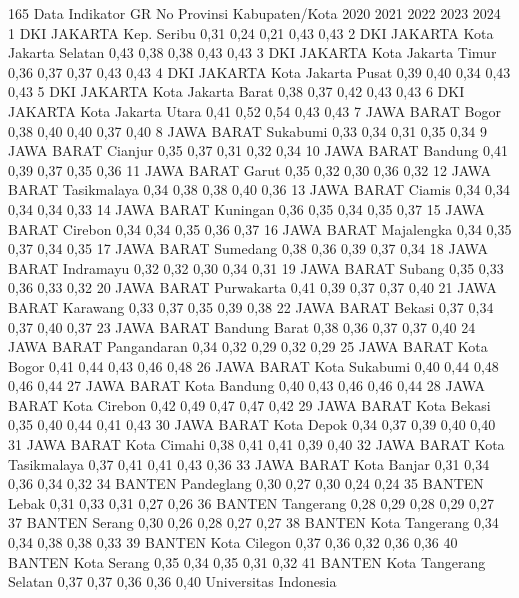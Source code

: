 165
Data Indikator GR
No Provinsi Kabupaten/Kota 2020 2021 2022 2023 2024
1 DKI JAKARTA Kep. Seribu 0,31 0,24 0,21 0,43 0,43
2 DKI JAKARTA Kota Jakarta Selatan 0,43 0,38 0,38 0,43 0,43
3 DKI JAKARTA Kota Jakarta Timur 0,36 0,37 0,37 0,43 0,43
4 DKI JAKARTA Kota Jakarta Pusat 0,39 0,40 0,34 0,43 0,43
5 DKI JAKARTA Kota Jakarta Barat 0,38 0,37 0,42 0,43 0,43
6 DKI JAKARTA Kota Jakarta Utara 0,41 0,52 0,54 0,43 0,43
7 JAWA BARAT Bogor 0,38 0,40 0,40 0,37 0,40
8 JAWA BARAT Sukabumi 0,33 0,34 0,31 0,35 0,34
9 JAWA BARAT Cianjur 0,35 0,37 0,31 0,32 0,34
10 JAWA BARAT Bandung 0,41 0,39 0,37 0,35 0,36
11 JAWA BARAT Garut 0,35 0,32 0,30 0,36 0,32
12 JAWA BARAT Tasikmalaya 0,34 0,38 0,38 0,40 0,36
13 JAWA BARAT Ciamis 0,34 0,34 0,34 0,34 0,33
14 JAWA BARAT Kuningan 0,36 0,35 0,34 0,35 0,37
15 JAWA BARAT Cirebon 0,34 0,34 0,35 0,36 0,37
16 JAWA BARAT Majalengka 0,34 0,35 0,37 0,34 0,35
17 JAWA BARAT Sumedang 0,38 0,36 0,39 0,37 0,34
18 JAWA BARAT Indramayu 0,32 0,32 0,30 0,34 0,31
19 JAWA BARAT Subang 0,35 0,33 0,36 0,33 0,32
20 JAWA BARAT Purwakarta 0,41 0,39 0,37 0,37 0,40
21 JAWA BARAT Karawang 0,33 0,37 0,35 0,39 0,38
22 JAWA BARAT Bekasi 0,37 0,34 0,37 0,40 0,37
23 JAWA BARAT Bandung Barat 0,38 0,36 0,37 0,37 0,40
24 JAWA BARAT Pangandaran 0,34 0,32 0,29 0,32 0,29
25 JAWA BARAT Kota Bogor 0,41 0,44 0,43 0,46 0,48
26 JAWA BARAT Kota Sukabumi 0,40 0,44 0,48 0,46 0,44
27 JAWA BARAT Kota Bandung 0,40 0,43 0,46 0,46 0,44
28 JAWA BARAT Kota Cirebon 0,42 0,49 0,47 0,47 0,42
29 JAWA BARAT Kota Bekasi 0,35 0,40 0,44 0,41 0,43
30 JAWA BARAT Kota Depok 0,34 0,37 0,39 0,40 0,40
31 JAWA BARAT Kota Cimahi 0,38 0,41 0,41 0,39 0,40
32 JAWA BARAT Kota Tasikmalaya 0,37 0,41 0,41 0,43 0,36
33 JAWA BARAT Kota Banjar 0,31 0,34 0,36 0,34 0,32
34 BANTEN Pandeglang 0,30 0,27 0,30 0,24 0,24
35 BANTEN Lebak 0,31 0,33 0,31 0,27 0,26
36 BANTEN Tangerang 0,28 0,29 0,28 0,29 0,27
37 BANTEN Serang 0,30 0,26 0,28 0,27 0,27
38 BANTEN Kota Tangerang 0,34 0,34 0,38 0,38 0,33
39 BANTEN Kota Cilegon 0,37 0,36 0,32 0,36 0,36
40 BANTEN Kota Serang 0,35 0,34 0,35 0,31 0,32
41 BANTEN Kota Tangerang Selatan 0,37 0,37 0,36 0,36 0,40
Universitas Indonesia

